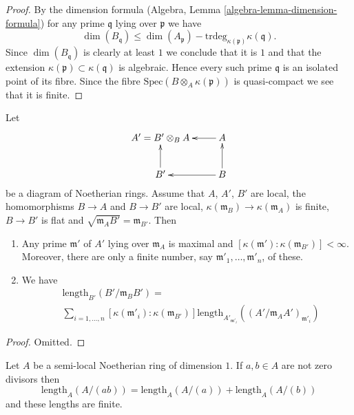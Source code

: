 \begin{proof}
By the dimension formula (Algebra, Lemma \ref{algebra-lemma-dimension-formula})
for any prime $\mathfrak q$ lying over $\mathfrak p$ we have
$$
\dim(B_{\mathfrak q}) \leq
\dim(A_{\mathfrak p}) - \text{trdeg}_{\kappa(\mathfrak p)} \kappa(\mathfrak q).
$$
Since $\dim(B_{\mathfrak q})$ is clearly at least $1$ we conclude that
it is $1$ and that the extension
$\kappa(\mathfrak p) \subset \kappa(\mathfrak q)$ is algebraic.
Hence every such prime $\mathfrak q$ is an isolated point of its fibre.
Since the fibre $\text{Spec}(B \otimes_A \kappa(\mathfrak p))$
is quasi-compact we see that it is finite.
\end{proof}



\begin{lemma}
\label{lemma-flat-pullback-pushdown-module}
Let
$$
\xymatrix{
A' = B' \otimes_B A & A \ar[l] \\
B' \ar[u] & B \ar[l] \ar[u]
}
$$
be a diagram of Noetherian rings. Assume that $A$, $A'$, $B'$ are local,
the homomorphisms $B \to A$ and $B \to B'$ are local,
$\kappa(\mathfrak m_B) \to \kappa(\mathfrak m_A)$ is finite,
$B \to B'$ is flat and $\sqrt{\mathfrak m_A B'} = \mathfrak m_{B'}$.
Then
\begin{enumerate}
\item Any prime $\mathfrak m'$ of $A'$ lying over $\mathfrak m_A$
is maximal and $[\kappa(\mathfrak m') : \kappa(\mathfrak m_{B'})] < \infty$.
Moreover, there are only a finite number, say
$\mathfrak m'_1, \ldots, \mathfrak m'_n$, of these.
\item We have
\begin{align*}
[\kappa(\mathfrak m_A) : \kappa(\mathfrak m_B)]
&
\text{length}_{B'}(B'/\mathfrak m_BB')
= \\
& \sum\nolimits_{i = 1, \ldots, n}
[\kappa(\mathfrak m'_i) : \kappa(\mathfrak m_{B'})]
\text{length}_{A'_{\mathfrak m'_i}}((A'/\mathfrak m_AA')_{\mathfrak m'_i})
\end{align*}
\end{enumerate}
\end{lemma}

\begin{proof}
Omitted.
\end{proof}

\begin{lemma}
\label{lemma-length-additive}
Let $A$ be a semi-local Noetherian ring of dimension $1$.
If $a, b \in A$ are not zero divisors then
$$
\text{length}_A(A/(ab)) =
\text{length}_A(A/(a)) +
\text{length}_A(A/(b))
$$
and these lengths are finite.
\end{lemma}

